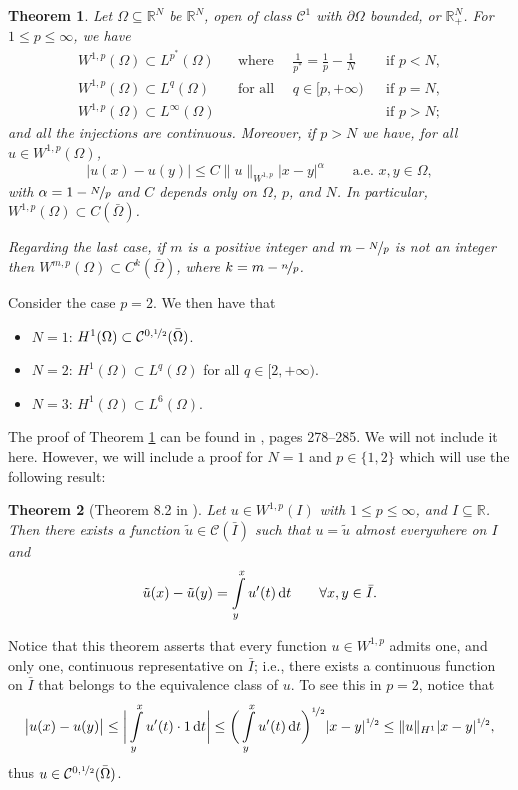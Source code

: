 \documentclass[a4paper,doc,11pt]{article}
\newtheorem{theorem}{Theorem}[section]
\newcommand{\R}{\mathbb{R}}
\newcommand{\CC}{\mathcal{C}}
\begin{document}
\begin{theorem}
\label{theo:SGN}
    Let \( \Omega \subseteq \R^N \)  be \( \R^N\), open of class \(\CC^1\) with \(\partial \Omega\) bounded, or \( \R^N_+\). For \( 1\leq p \leq \infty\), we have
    \begin{align}
        W^{1,p} (\Omega) \subset L^{p^*} (\Omega) && \text{where } \quad\frac{1}{p^*} = \frac{1}{p} - \frac{1}{N} && \text{if } p < N,
        \\
        W^{1,p} (\Omega) \subset L^{q} (\Omega) && \text{for all } \quad q \in [p,+\infty) && \text{if } p = N,
        \\
        W^{1,p} (\Omega) \subset L^{\infty} (\Omega) &&  && \text{if } p > N;
    \end{align}
    and all the injections are continuous. Moreover, if \(p > N\) we have, for all \(u \in W^{1,p} (\Omega)\),
    \[
        |u(x) - u(y)| \leq C\|u\|_{W^{1,p}} |x-y|^\alpha \qquad \text{a.e. }  x,y \in \Omega,
    \]
    with \(\alpha = 1 - \nicefrac N p\) and \(C\) depends only on \(\Omega\), \(p\), and \(N\). In particular, \( W^{1,p} (\Omega) \subset C(\bar \Omega)\).
    
    Regarding the last case, if \(m\) is a positive integer and \( m - \nicefrac N p\) is not an integer then \( W^{m,p} (\Omega) \subset C^k (\bar \Omega)\), where \( k = m - \nicefrac n p\).
\end{theorem}

Consider the case \(p = 2\). We then have that
\begin{itemize}
    \item \(N = 1\): \( H^1 (\Omega) \subset \CC^{0, \nicefrac 1 2} (\bar \Omega)\).
    \item \(N = 2\):  \( H^1 (\Omega) \subset L^{q} (\Omega)\) for all  \( q \in [2,+\infty)\).
    \item \(N = 3\): \( H^1 (\Omega) \subset L^{6} (\Omega)\).
\end{itemize}

The proof of Theorem \ref{theo:SGN} can be found in \citep{Brezis2010}, pages 278--285. We will not include it here. However, we will include a proof for \( N=1\) and \( p \in \{1,2\}\) which will use the following result:

\begin{theorem}[Theorem 8.2 in \citep{Brezis2010}]
    Let \(u \in W^{1,p} (I)\) with \( 1\leq p \leq \infty\), and \(I \subseteq \R\). Then there exists a function \( \tilde u \in \CC (\bar I)\) such that \( u = \tilde u\) almost everywhere on \(I\) and
    \[
        \tilde{u} (x) - \tilde{u}(y) = \int\limits_y^x u'(t) \dif t \qquad \forall x,y \in \bar I.
    \]
\end{theorem}
Notice that this theorem asserts that every function \( u\in W^{1,p} \) admits one, and only one, continuous representative on \(\bar I\); i.e., there exists a continuous function on \(\bar I\) that belongs to the equivalence class of \(u\). To see this in \( p=2\), notice that
\[
    \big| u(x) - u(y) \big| \leq \bigg| \int\limits_y^x u'(t) \cdot 1 \dif t \bigg|
    \leq
    \bigg(\int\limits_y^x u'(t) \dif t \bigg)^{\nicefrac 1 2} |x-y|^{\nicefrac 1 2}
    \leq \|u\|_{H^1} |x-y|^{\nicefrac 1 2},
\]
thus \( u \in \CC^{0,\nicefrac 1 2} (\bar \Omega)\). 
\end{document}
